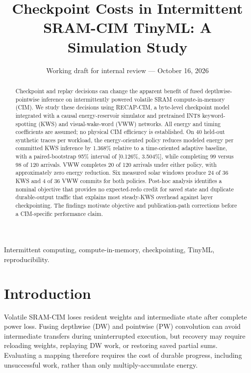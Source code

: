 \documentclass[journal,10pt]{IEEEtran}
\begin{document}
\title{Checkpoint Costs in Intermittent SRAM-CIM TinyML: A Simulation Study}
\author{Working draft for internal review --- October 16, 2026}
\maketitle
{}
\begin{abstract}
Checkpoint and replay decisions can change the apparent benefit of fused depthwise-pointwise inference on intermittently powered volatile SRAM compute-in-memory (CIM). We study these decisions using RECAP-CIM, a byte-level checkpoint model integrated with a causal energy-reservoir simulator and pretrained INT8 keyword-spotting (KWS) and visual-wake-word (VWW) networks. All energy and timing coefficients are assumed; no physical CIM efficiency is established. On 40 held-out synthetic traces per workload, the energy-oriented policy reduces modeled energy per committed KWS inference by 1.368\% relative to a time-oriented adaptive baseline, with a paired-bootstrap 95\% interval of [0.126\%, 3.504\%], while completing 99 versus 98 of 120 arrivals. VWW completes 20 of 120 arrivals under either policy, with approximately zero energy reduction. Six measured solar windows produce 24 of 36 KWS and 4 of 36 VWW commits for both policies. Post-hoc analysis identifies a nominal objective that provides no expected-redo credit for saved state and duplicate durable-output traffic that explains most steady-KWS overhead against layer checkpointing. The findings motivate objective and publication-path corrections before a CIM-specific performance claim.
\end{abstract}
\begin{IEEEkeywords}
Intermittent computing, compute-in-memory, checkpointing, TinyML, reproducibility.
\end{IEEEkeywords}
\section{Introduction}
Volatile SRAM-CIM loses resident weights and intermediate state after complete power loss. Fusing depthwise (DW) and pointwise (PW) convolution can avoid intermediate transfers during uninterrupted execution, but recovery may require reloading weights, replaying DW work, or restoring saved partial sums. Evaluating a mapping therefore requires the cost of durable progress, including unsuccessful work, rather than only multiply-accumulate energy.
\end{document}
